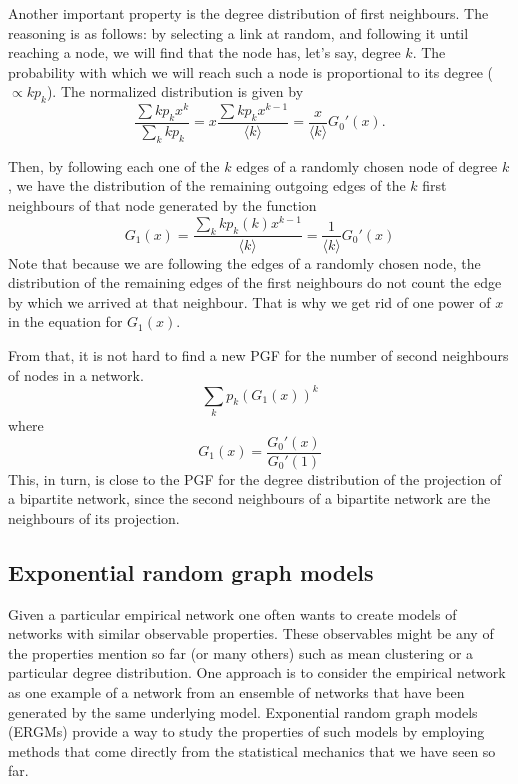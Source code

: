 Another important property is the degree distribution of first neighbours. The reasoning is as follows: by selecting a link at random, and following it until reaching a node, we will find that the node has, let's say, degree $k$. The probability with which we will reach such a node is proportional to its degree ($\propto kp_{k}$). The normalized distribution is given by
$$
	\dfrac{\sum kp_{k}x^{k}}{\sum_{k}kp_{k}} = x \dfrac{\sum kp_{k}x^{k-1}}{\langle k \rangle} = \dfrac{x}{\langle k \rangle}G_{0}'(x).
$$

Then, by following each one of the $k$ edges of a randomly chosen node of degree $k$, we have the distribution of the remaining outgoing edges of the $k$ first neighbours of that node generated by the function 
$$
	G_{1}(x) = \dfrac{\sum_{k}kp_{k}(k)x^{k-1}}{\langle k \rangle} = \dfrac{1}{\langle k \rangle}G_{0}'(x)
$$
Note that because we are following the edges of a randomly chosen node, the distribution of the remaining edges of the first neighbours do not count the edge by which we arrived at that neighbour. That is why we get rid of one power of $x$ in the equation for $G_{1}(x)$.

From that, it is not hard to find a new PGF for the number of second neighbours of nodes in a network. 
$$\sum_k p_k (G_1(x))^k $$ 
where 
$$G_1(x) = \frac{G_{0}'(x)}{G_{0}'(1)}$$ 
This, in turn, is close to the PGF for the degree distribution of the projection of a bipartite network, since the second neighbours of a bipartite network are the neighbours of its projection.

\subsection{Exponential random graph models}
Given a particular empirical network one often wants to create models of networks with similar observable properties. These observables might be any of the properties mention so far (or many others) such as mean clustering or a particular degree distribution. One approach is to consider the empirical network as one example of a network from an ensemble of networks that have been generated by the same underlying model. Exponential random graph models (ERGMs) provide a way to study the properties of such models by employing methods that come directly from the statistical mechanics that we have seen so far.

